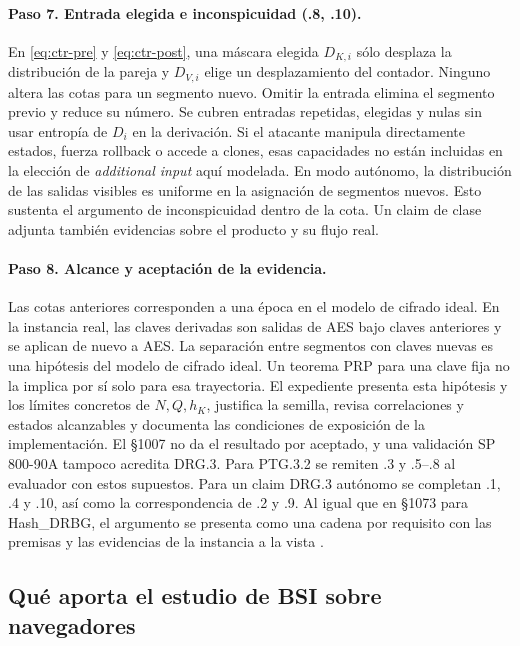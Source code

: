 \documentclass[11pt,a4paper]{article}
\begin{document}
\paragraph{Paso 7. Entrada elegida e inconspicuidad (.8, .10).}
En \eqref{eq:ctr-pre} y \eqref{eq:ctr-post}, una máscara
elegida \(D_{K,i}\) sólo desplaza la distribución de la
pareja y \(D_{V,i}\) elige un desplazamiento del contador.
Ninguno altera las cotas para un segmento nuevo.
Omitir la entrada elimina el segmento previo y reduce
su número. Se cubren entradas repetidas, elegidas y nulas
sin usar entropía de \(D_i\) en la derivación. Si el
atacante manipula directamente estados, fuerza rollback
o accede a clones, esas capacidades no están incluidas
en la elección de \emph{additional input} aquí modelada.
En modo autónomo, la distribución de las salidas visibles
es uniforme en la asignación de segmentos nuevos. Esto
sustenta el argumento de inconspicuidad dentro de la cota.
Un claim de clase adjunta también evidencias sobre el
producto y su flujo real.

\paragraph{Paso 8. Alcance y aceptación de la evidencia.}
Las cotas anteriores corresponden a una época en el modelo de cifrado ideal. En la
instancia real, las claves derivadas son salidas de
AES bajo claves anteriores y se aplican de nuevo a AES.
La separación entre segmentos con claves nuevas es una
hipótesis del modelo de cifrado ideal. Un teorema PRP
para una clave fija no la implica por sí solo para esa
trayectoria. El expediente presenta esta hipótesis y
los límites concretos de \(N,Q,h_K\), justifica la
semilla, revisa correlaciones y estados alcanzables y
documenta las condiciones de exposición de la
implementación. El §1007 no da el resultado por
aceptado, y una validación SP 800-90A tampoco acredita
DRG.3. Para PTG.3.2 se remiten .3 y .5--.8 al
evaluador con estos supuestos. Para un claim DRG.3
autónomo se completan .1, .4 y .10, así como la
correspondencia de .2 y .9. Al igual que en §1073
para Hash\_DRBG, el argumento se presenta como una
cadena por requisito con las premisas y las
evidencias de la instancia a la vista
\cite[§§93--103, 121--125, 207, 211--214, 380, 1007 y 1073--1075]{ais}.



\subsection{Qué aporta el estudio de BSI sobre navegadores}
\label{sec:bsi-browsers}
\end{document}
